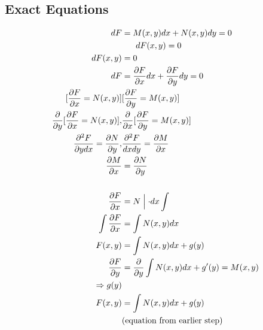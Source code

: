 \documentclass[10pt, letterpaper]{article}
\begin{document}
\subsection{Exact Equations}
\begin{align*}
dF &= M(x,y)dx +N(x,y)dy =0\\
&~~~~~ dF(x,y) = 0\\
dF(x,y) &= 0\\
dF &= \frac{\partial F}{\partial x} dx + \frac{\partial F}{\partial y} dy = 0\\
[\frac{\partial F}{\partial x} = N(x,y)] & [\frac{\partial F}{\partial y} = M(x,y)]\\
\frac{\partial}{\partial y} [\frac{\partial F}{\partial x} = N(x,y)], & \frac{\partial}{\partial x} [\frac{\partial F}{\partial y} = M(x,y)]\\
\frac{\partial^2 F}{\partial y dx} = \frac{\partial N}{\partial y}, & \frac{\partial^2 F}{dx dy} = \frac{\partial M}{\partial x}\\
\frac{\partial M}{\partial x} &= \frac{\partial N}{\partial y}\\
\\
\frac{\partial F}{\partial x} &= N \Bigm \lvert \cdot dx \int \limits\\
\int \limits \frac{\partial F}{\partial x} &= \int \limits N(x,y) dx\\
F(x,y) &= \int \limits N(x,y)dx + g(y)\\
\frac{\partial F}{\partial y} &= \frac{\partial}{\partial y} \int \limits N(x,y) dx + g'(y) = M(x,y)\\
\Rightarrow g(y)\\
F(x,y) &= \int \limits N(x,y)dx + g(y)\\
&(\text{equation from earlier step})
\end{align*}
\end{document}
